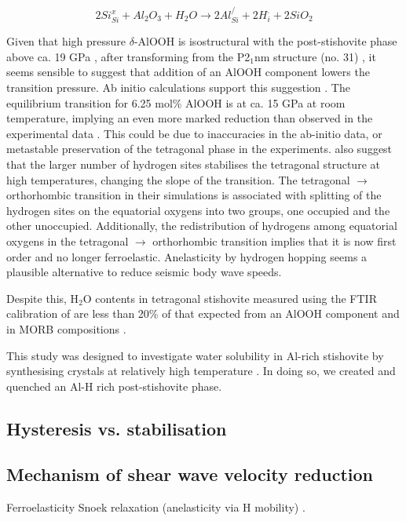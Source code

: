 \documentclass[review]{elsarticle}
\begin{document}
\begin{equation}
2Si^x_{Si} + Al_2O_3 + H_2O \rightarrow 2Al^/_{Si} + 2H^{.}_i + 2SiO_2
\end{equation}

Given that high pressure $\delta$-AlOOH is isostructural with the post-stishovite phase above ca. 19 GPa \citep{SKVO2008, KSN2014}, after transforming from the P2$_1$nm structure (no. 31) \citep{SOK2000, KKSOK2006, VSKOS2007}, it seems sensible to suggest that addition of an AlOOH component lowers the transition pressure. Ab initio calculations support this suggestion \citep{UKHRW2015}. The equilibrium transition for 6.25 mol\% AlOOH is at ca. 15 GPa at room temperature, implying an even more marked reduction than observed in the experimental data \citep{Lakshtanovetal2007}. This could be due to inaccuracies in the ab-initio data, or metastable preservation of the tetragonal phase in the experiments. \cite{UKHRW2015} also suggest that the larger number of hydrogen sites stabilises the tetragonal structure at high temperatures, changing the slope of the transition. The tetragonal $\rightarrow$ orthorhombic transition in their simulations is associated with splitting of the hydrogen sites on the equatorial oxygens into two groups, one occupied and the other unoccupied.  Additionally, the redistribution of hydrogens among equatorial oxygens in the tetragonal $\rightarrow$ orthorhombic transition implies that it is now first order and no longer ferroelastic. Anelasticity by hydrogen hopping seems a plausible alternative to reduce seismic body wave speeds. %


Despite this, H$_2$O contents in tetragonal stishovite measured using the FTIR calibration of \cite{PMH1993} are less than 20\% of that expected from an AlOOH component \citep{PBJ2003, BBB2006, LKSOLBI2007} and in MORB compositions \citep{CK2002}.

This study was designed to investigate water solubility in Al-rich stishovite by synthesising crystals at relatively high temperature \citep{Ono1999}. In doing so, we created and quenched an Al-H rich post-stishovite phase.


\subsection{Hysteresis vs. stabilisation}
\citep{UKHRW2015}


\subsection{Mechanism of shear wave velocity reduction}
Ferroelasticity \citep{CHM2000}
Snoek relaxation (anelasticity via H mobility) \citep{Snoek1941, NB1972, MCDBT2007}.
\end{document}

